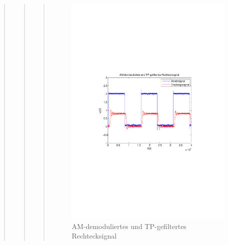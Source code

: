 \begin{quote}
\begin{quote}
\begin{quote}
                 \begin{figure}[H] \centering
                        \includegraphics[scale=0.5, trim = 3cm 9cm 3.5cm 9.5cm,
                        clip]{./Bilder/synchDemodFilter_rechteck}
                            \caption{AM-demoduliertes und
                            TP-gefiltertes Rechtecksignal}
                    \end{figure}
                    

\end{quote}
\end{quote}
\end{quote}
